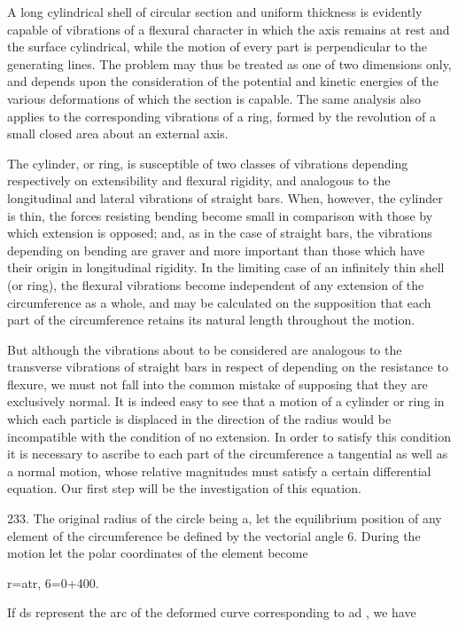 A long cylindrical shell of circular section and uniform thickness is
evidently capable of vibrations of a flexural character in which the
axis remains at rest and the surface cylindrical, while the motion of
every part is perpendicular to the generating lines. The problem may
thus be treated as one of two dimensions only, and depends upon the
consideration of the potential and kinetic energies of the various
deformations of which the section is capable. The same analysis also
applies to the corresponding vibrations of a ring, formed by the
revolution of a small closed area about an external axis.

The cylinder, or ring, is susceptible of two classes of vibrations
depending respectively on extensibility and flexural rigidity, and
analogous to the longitudinal and lateral vibrations of straight bars.
When, however, the cylinder is thin, the forces resisting bending become
small in comparison with those by which extension is opposed; and, as in
the case of straight bars, the vibrations depending on bending are
graver and more important than those which have their origin in
longitudinal rigidity. In the limiting case of an infinitely thin shell
(or ring), the flexural vibrations become independent of any extension
of the circumference as a whole, and may be calculated on the
supposition that each part of the circumference retains its natural
length throughout the motion.

But although the vibrations about to be considered are analogous to the
transverse vibrations of straight bars in respect of depending on the
resistance to flexure, we must not fall into the common mistake of
supposing that they are exclusively normal. It is indeed easy to see
that a motion of a cylinder or ring in which each particle is displaced
in the direction of the radius would be incompatible with the condition
of no extension. In order to satisfy this condition it is necessary to
ascribe to each part of the circumference a tangential as well as a
normal motion, whose relative magnitudes must satisfy a certain
differential equation. Our first step will be the investigation of this
equation.

233. The original radius of the circle being a, let the equilibrium
position of any element of the circumference be defined by the vectorial
angle 6. During the motion let the polar coordinates of the element
become

r=atr, 6=0+400.

If ds represent the arc of the deformed curve corresponding to ad , we
have

